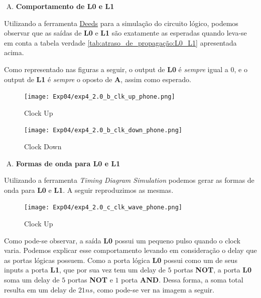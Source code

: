 \documentclass[12pt]{article}
\begin{document}
\begin{enumerate}[B)]
\item \textbf{Comportamento de L0 e L1}
\end{enumerate}

Utilizando a ferramenta
\href{https://www.digitalelectronicsdeeds.com/deeds.html}{Deeds} para a
simulação do circuito lógico, podemos observar que as saídas de \textbf{L0} e
\textbf{L1} são exatamente as esperadas quando leva-se em conta a tabela verdade
\ref{tab:atraso_de_propagação:L0_L1} apresentada acima.

Como representado nas figuras a seguir, o output de \textbf{L0} é \emph{sempre}
igual a $0$, e o output de \textbf{L1} é \emph{sempre} o oposto de \textbf{A},
assim como esperado.

\begin{figure}[H]
    \centering
    \texttt{[image: Exp04/exp4\_2.0\_b\_clk\_up\_phone.png]}
    \caption{Clock Up}\label{fig:exp4_2.0_b_clk_up_phone.png}
\end{figure}

\begin{figure}[H]
    \centering
    \texttt{[image: Exp04/exp4\_2.0\_b\_clk\_down\_phone.png]}
    \caption{Clock Down}\label{fig:exp4_2.0_b_clk_down_phone.png}
\end{figure}

\begin{enumerate}[C)]
\item \textbf{Formas de onda para L0 e L1}
\end{enumerate}

Utilizando a ferramenta \emph{Timing Diagram Simulation} podemos gerar as
formas de onda para \textbf{L0} e \textbf{L1}. A seguir reproduzimos as mesmas.

\begin{figure}[H]
    \centering
    \texttt{[image: Exp04/exp4\_2.0\_c\_clk\_wave\_phone.png]}
    \caption{Clock Up}\label{fig:exp4_2.0_c_clk_wave_phone.png}
\end{figure}

Como pode-se observar, a saída \textbf{L0} possui um pequeno pulso quando o
clock varia. Podemos explicar esse comportamento levando em consideração o delay
que as portas lógicas possuem. Como a porta lógica \textbf{L0} possui como um de
seus inputs a porta \textbf{L1}, que por sua vez tem um delay de $5$ portas
\textbf{NOT}, a porta \textbf{L0} soma um delay de $5$ portas \textbf{NOT} e $1$
porta \textbf{AND}. Dessa forma, a soma total resulta em um delay de $21ns$,
como pode-se ver na imagem a seguir.
\end{document}
